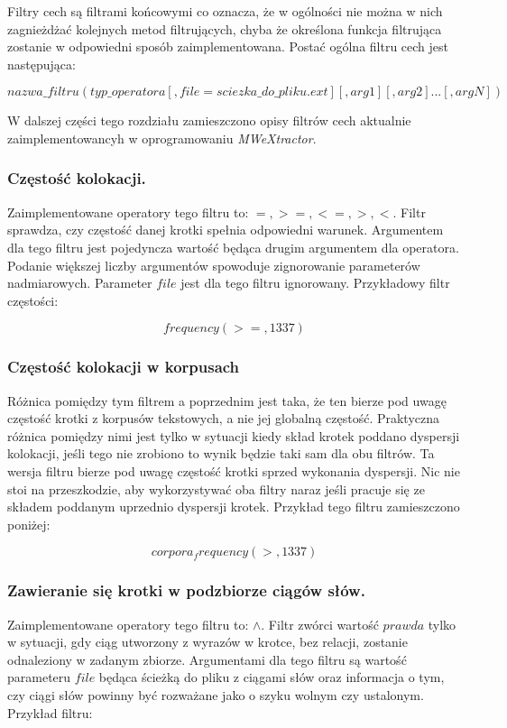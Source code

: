 \documentclass[11pt,a4paper]{llncs}
\begin{document}
Filtry cech są filtrami końcowymi co oznacza, że w ogólności nie można w nich zagnieżdżać kolejnych metod filtrujących, chyba że określona funkcja filtrująca zostanie w odpowiedni sposób zaimplementowana.
Postać ogólna filtru cech jest następująca:

$$ nazwa\_filtru(typ\_operatora[,file=sciezka\_do\_pliku.ext][,arg1][,arg2]...[,argN]) $$

W dalszej części tego rozdziału zamieszczono opisy filtrów cech aktualnie zaimplementowancyh w oprogramowaniu \emph{MWeXtractor}.

\subsubsection{Częstość kolokacji.}
Zaimplementowane operatory tego filtru to: $ =, >=, <=, >, < $.
Filtr sprawdza, czy częstość danej krotki spełnia odpowiedni warunek.
Argumentem dla tego filtru jest pojedyncza wartość będąca drugim argumentem dla operatora.
Podanie większej liczby argumentów spowoduje zignorowanie parameterów nadmiarowych.
Parameter $ file $ jest dla tego filtru ignorowany.
Przykładowy filtr częstości:

$$ frequency(>=,1337) $$

\subsubsection{Częstość kolokacji w korpusach}
Różnica pomiędzy tym filtrem a poprzednim jest taka, że ten bierze pod uwagę częstość krotki z korpusów tekstowych, a nie jej globalną częstość.
Praktyczna różnica pomiędzy nimi jest tylko w sytuacji kiedy skład krotek poddano dyspersji kolokacji, jeśli tego nie zrobiono to wynik będzie taki sam dla obu filtrów.
Ta wersja filtru bierze pod uwagę częstość krotki sprzed wykonania dyspersji.
Nic nie stoi na przeszkodzie, aby wykorzystywać oba filtry naraz jeśli pracuje się ze składem poddanym uprzednio dyspersji krotek.
Przykład tego filtru zamieszczono poniżej:

$$ corpora_frequency(>,1337) $$

\subsubsection{Zawieranie się krotki w podzbiorze ciągów słów.}
Zaimplementowane operatory tego filtru to: $ \wedge $.
Filtr zwórci wartość $ prawda $ tylko w sytuacji, gdy ciąg utworzony z wyrazów w krotce, bez relacji, zostanie odnaleziony w zadanym zbiorze.
Argumentami dla tego filtru są wartość parameteru $ file $ będąca ścieżką do pliku z ciągami słów oraz informacja o tym, czy ciągi słów powinny być rozważane jako o szyku wolnym czy ustalonym.
Przykład filtru:
\end{document}
